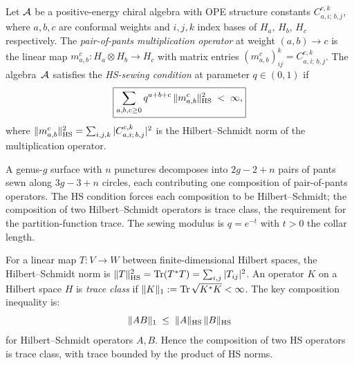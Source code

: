 \begin{definition}
\label{def:thqg-I-hs-sewing}
Let $\mathcal{A}$ be a positive-energy chiral algebra with OPE structure constants $C^{c,k}_{a,i;\,b,j}$, where $a,b,c$ are conformal weights and $i,j,k$ index bases of $H_a$, $H_b$, $H_c$ respectively. The \emph{pair-of-pants multiplication operator} at weight $(a,b) \to c$ is the linear map $m^c_{a,b} \colon H_a \otimes H_b \to H_c$ with matrix entries $(m^c_{a,b})_{ij}^k = C^{c,k}_{a,i;\,b,j}$. The algebra~$\mathcal{A}$ satisfies the \emph{HS-sewing condition} at parameter $q \in (0,1)$ if
\begin{equation}\label{eq:thqg-I-hs-sewing-condition}
\boxed{ \sum_{a,b,c \geq 0} q^{a+b+c}\, \|m^c_{a,b}\|_{\operatorname{HS}}^2 \;<\; \infty,}
\end{equation}
where $\|m^c_{a,b}\|_{\operatorname{HS}}^2 = \sum_{i,j,k} |C^{c,k}_{a,i;\,b,j}|^2$ is the Hilbert--Schmidt norm of the multiplication operator.
\end{definition}

\begin{remark}
\label{rem:thqg-I-hs-physical}
A genus-$g$ surface with $n$ punctures decomposes into $2g - 2 + n$ pairs of pants sewn along $3g - 3 + n$ circles, each contributing one composition of pair-of-pants operators. The HS condition forces each composition to be Hilbert--Schmidt; the composition of two Hilbert--Schmidt operators is trace class, the requirement for the partition-function trace. The sewing modulus is $q = e^{-t}$ with $t > 0$ the collar length.
\end{remark}

\begin{definition}
\label{def:thqg-I-hs-trace-norms}
For a linear map $T \colon V \to W$ between finite-dimensional Hilbert spaces, the Hilbert--Schmidt norm is $\|T\|_{\operatorname{HS}}^2 = \operatorname{Tr}(T^*T) = \sum_{i,j} |T_{ij}|^2$. An operator $K$ on a Hilbert space $H$ is \emph{trace class} if $\|K\|_1 := \operatorname{Tr}\sqrt{K^*K} < \infty$. The key composition inequality is:
\begin{equation}\label{eq:thqg-I-hs-composition}
\|AB\|_1 \;\leq\; \|A\|_{\operatorname{HS}}\,\|B\|_{\operatorname{HS}}
\end{equation}
for Hilbert--Schmidt operators $A, B$. Hence the composition of two HS operators is trace class, with trace bounded by the product of HS norms.
\end{definition}

